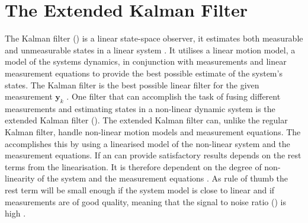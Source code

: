 \section{The Extended Kalman Filter}
The Kalman filter (\abbrKF) is a linear state-space observer, it estimates both measurable and unmeasurable states in a linear system \citep{sensorfusion}. It utilises a linear motion model, a model of the systems dynamics, in conjunction with measurements and linear measurement equations to provide the best possible estimate of the system's states. The Kalman filter is the best possible linear filter for the given measurement $\boldsymbol{y}_{k}$ \citep{sensorfusion}. One filter that can accomplish the task of fusing different measurements and estimating states in a non-linear dynamic system is the extended Kalman filter (\abbrEKF). The extended Kalman filter can, unlike the regular Kalman filter, handle non-linear motion models and measurement equations. The \abbrEKF accomplishes this by using a linearised model of the non-linear system and the measurement equations. If an \abbrEKF can provide satisfactory results depends on the rest terms from the linearisation. It is therefore dependent on the degree of non-linearity of the system and the measurement equations \citep{sensorfusion}. As rule of thumb the rest term will be small enough if the system model is close to linear and if measurements are of good quality, meaning that the signal to noise ratio (\abbrSNR) is high \citep{sensorfusion}. 

